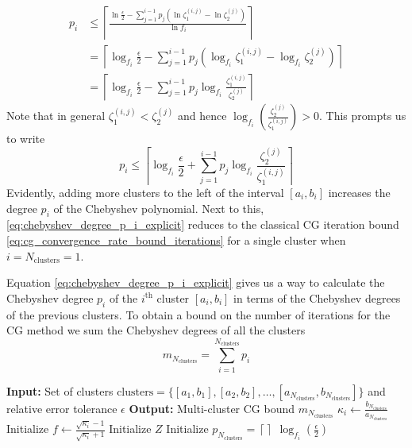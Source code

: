 \begin{align*}
    p_i &\leq \left\lceil\frac{\ln{\frac{\epsilon}{2}} - \sum_{j=1}^{i-1} p_j\left(\ln{\zeta^{(i,j)}_1} - \ln{\zeta^{(j)}_2} \right)}{\ln{f_i}}\right\rceil \\
    &= \left\lceil\log_{f_i}{\frac{\epsilon}{2}} - \sum_{j=1}^{i-1} p_j\left(\log_{f_i}{\zeta^{(i,j)}_1} - \log_{f_i}{\zeta^{(j)}_2} \right)\right\rceil\\
    &= \left\lceil\log_{f_i}{\frac{\epsilon}{2}} - \sum_{j=1}^{i-1} p_j\log_{f_i}{\frac{\zeta^{(i,j)}_1}{\zeta^{(j)}_2}} \right\rceil
\end{align*}
Note that in general $\zeta^{(i,j)}_1 < \zeta^{(j)}_2$ and hence $\log_{f_i}{\left(\frac{\zeta^{(j)}_2}{\zeta^{(i,j)}_1}\right)} > 0$. This prompts us to write
\begin{equation}
    p_i \leq \left\lceil\log_{f_i}{\frac{\epsilon}{2}} + \sum_{j=1}^{i-1} p_j\log_{f_i}{\frac{\zeta^{(j)}_2}{\zeta^{(i,j)}_1}} \right\rceil
    \label{eq:chebyshev_degree_p_i_explicit}
\end{equation}
Evidently, adding more clusters to the left of the interval $[a_i,b_i]$ increases the degree $p_i$ of the Chebyshev polynomial. Next to this, \cref{eq:chebyshev_degree_p_i_explicit} reduces to the classical CG iteration bound \cref{eq:cg_convergence_rate_bound_iterations} for a single cluster when $i = N_{\text{clusters}} = 1$.

Equation \ref{eq:chebyshev_degree_p_i_explicit} gives us a way to calculate the Chebyshev degree $p_i$ of the $i^{\text{th}}$ cluster $[a_i,b_i]$ in terms of the Chebyshev degrees of the previous clusters. To obtain a bound on the number of iterations for the CG method we sum the Chebyshev degrees of all the clusters
\begin{equation}
    m_{N_{\text{clusters}}} = \sum_{i=1}^{N_{\text{clusters}}} p_i
    \label{eq:cg_iteration_bound_multiple_clusters}
\end{equation}

\begin{algorithm}[H]
    \caption{$\operatorname{MultiClusterBound}(\text{clusters}, \epsilon)$}
    \begin{algorithmic}[1]
        \State \textbf{Input:} Set of clusters $\text{clusters} = \{[a_1, b_1], [a_2, b_2], \ldots, [a_{N_{\text{clusters}}}, b_{N_{\text{clusters}}}]\}$ and relative error tolerance $\epsilon$
        \State \textbf{Output:} Multi-cluster CG bound $m_{N_{\text{clusters}}}$
        \State $\kappa_i \gets \frac{b_{N_{\text{clusters}}}}{a_{N_{\text{clusters}}}}$
        \State Initialize $f \gets \frac{\sqrt{\kappa_i} - 1}{\sqrt{\kappa_i} + 1}$
            \State Initialize $Z$
            \State Initialize $p_{N_{\text{clusters}}} = \left\lceil\right\rceil$
            \State
        \Else
            \State \Return $\log_{f_i}\left(\frac{\epsilon}{2}\right)$
        \EndIf
    \end{algorithmic}
    \label{alg:multi_cluster_bound}
\end{algorithm}

